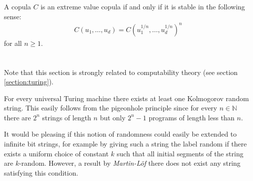     \begin{property}
        A copula $C$ is an extreme value copula if and only if it is stable in the following sense:
        \begin{gather}
        C(u_1, \ldots, u_d) = C(u_1^{1/n}, \ldots, u_d^{1/n})^n
        \end{gather}
        for all $n\geq1$.
    \end{property}

\section{}

    Note that this section is strongly related to computability theory (see section \ref{section:turing}).


    \begin{property}
        For every universal Turing machine there exists at least one Kolmogorov random string. This easily follows from the pigeonhole principle since for every $n\in\mathbb{N}$ there are $2^n$ strings of length $n$ but only $2^n-1$ programs of length less than $n$.
    \end{property}

    It would be pleasing if this notion of randomness could easily be extended to infinite bit strings, for example by giving such a string the label random if there exists a uniform choice of constant $k$ such that all initial segments of the string are $k$-random. However, a result by \textit{Martin-L\"of} there does not exist any string satisfying this condition.
